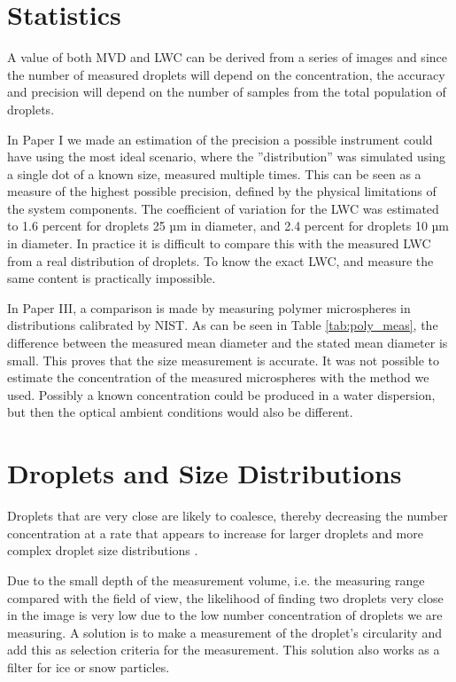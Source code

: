 \section{Statistics}

A value of both MVD and LWC can be derived from a series of images and since the number of measured droplets will depend on the concentration, the accuracy and precision will depend on the number of samples from the total population of droplets. 

In Paper I we made an estimation of the precision a possible instrument could have using the most ideal scenario, where the ''distribution'' was simulated using a single dot of a known size, measured multiple times. This can be seen as a measure of the highest possible precision, defined by the physical limitations of the system components. The coefficient of variation for the LWC was estimated to 1.6 percent for droplets 25 µm in diameter, and 2.4 percent for droplets 10 µm in diameter. In practice it is difficult to compare this with the measured LWC from a real  distribution of droplets. To know the exact LWC, and measure the same content is practically impossible. 

In Paper III, a comparison is made by measuring polymer microspheres in distributions calibrated by NIST. As can be seen in Table \ref{tab:poly_meas}, the difference between the measured mean diameter and the stated mean diameter is small. This proves that the size measurement is accurate. It was not possible to estimate the concentration of the measured microspheres with the method we used. Possibly a known concentration could be produced in a water dispersion, but then the optical ambient conditions would also be different.


\section{Droplets and Size Distributions}

Droplets that are very close are likely to coalesce, thereby decreasing the number concentration at a rate that appears to increase for larger droplets and more complex droplet size distributions \cite{borda2011}. 

Due to the small depth of the measurement volume, i.e. the measuring range compared with the field of view, the likelihood of finding two droplets very close in the image is very low due to the low number concentration of droplets we are measuring. A solution is to make a measurement of the droplet’s circularity and add this as selection criteria for the measurement. This solution also works as a filter for ice or snow particles. 

